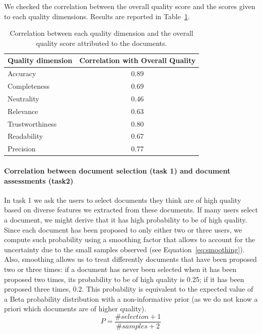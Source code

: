 \documentclass{llncs}
\begin{document}
We checked the correlation between the overall quality score and the scores given to each quality dimensions. Results are reported in Table~\ref{tab:corrj}.
\begin{table}
\centering
\caption{Correlation between each quality dimension and the overall quality score attributed to the documents.\label{tab:corrj}}
\begin{tabular}{|l|c|}
\hline
{\bf Quality dimension} & {\bf Correlation with Overall Quality} \\
\hline
Accuracy         &      0.89\\ \hline
Completeness     &      0.69\\ \hline  
Neutrality       &      0.46\\ \hline  
Relevance        &      0.63\\ \hline  
Trustworthiness  &      0.80\\ \hline  
Readability      &      0.67\\ \hline 
Precision        &      0.77\\ \hline 
\end{tabular}

\end{table}

\paragraph{Correlation between document selection (task 1) and document assessments (task2)}
In task 1 we ask the users to select documents they think are of high quality based on diverse features we extracted from these documents. If many users select a document, we might derive that it has high probability to be of high quality. Since each document has been proposed to only either two or three users, we compute such probability using a smoothing factor that allows to account for the uncertainty due to the small samples observed (see Equation~\eqref{eq:smoothing}). Also, smoothing allows us to treat differently documents that have been proposed two or three times: if a document has never been selected when it has been proposed two times, its probability to be of high quality is 0.25; if it has been proposed three times, 0.2. This probability is equivalent to the expected value of a Beta probability distribution with a non-informative prior (as we do not know a priori which documents are of higher quality).
\begin{equation}
P = \frac{\# selection +1}{\# samples + 2}
\label{eq:smoothing}
\end{equation}
\end{document}
